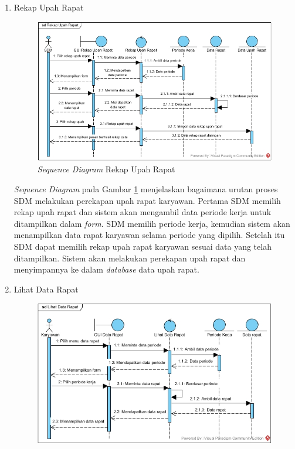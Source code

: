 \begin{enumerate}
\begin{enumerate}[label=\alph*.]
            	    \item Rekap Upah Rapat
            	    \begin{figure}[H]
            		    \centering
            		    \includegraphics[width=13cm]{gambar/sequence/rekap-upah-rapat}
            		    \caption{\emph{Sequence Diagram} Rekap Upah Rapat}
            		    \label{sequence_upah_rapat}
            		\end{figure}
            		\emph{Sequence Diagram} pada Gambar \ref{sequence_upah_rapat} menjelaskan bagaimana urutan proses SDM melakukan perekapan upah rapat karyawan. Pertama SDM memilih rekap upah rapat dan sistem akan mengambil data periode kerja untuk ditampilkan dalam \emph{form}. SDM memilih periode kerja, kemudian sistem akan menampilkan data rapat karyawan selama periode yang dipilih. Setelah itu SDM dapat memilih rekap upah rapat karyawan sesuai data yang telah ditampilkan. Sistem akan melakukan perekapan upah rapat dan menyimpannya ke dalam \emph{database} data upah rapat. \newpage
            	    \item Lihat Data Rapat
            	    \begin{figure}[H]
            		    \centering
            		    \includegraphics[width=13cm]{gambar/sequence/lihat-data-rapat}

\end{figure}
\end{enumerate}
\end{enumerate}
